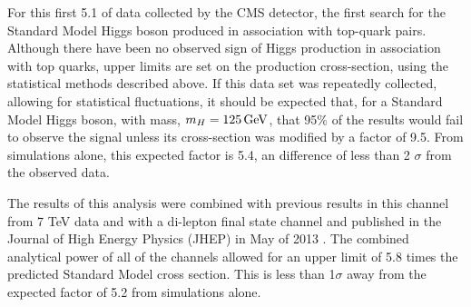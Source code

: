 \par  For this first 5.1 \fbinv of data collected by the CMS detector,
the first search for the Standard Model Higgs boson produced in
association with top-quark pairs.  Although there have been no
observed sign of Higgs production in association with top quarks,
upper limits are set on the production cross-section,  using the
statistical methods  described above.  If this data set was repeatedly
collected, allowing for statistical fluctuations, it should be
expected that, for a Standard Model Higgs boson, with mass, $m_{H} =
125 \,\text{Ge\hspace{-.08em}V}$, that 95$\%$ of the results would fail to observe the \ttH
signal unless its cross-section was modified by a factor of 9.5.  From
simulations alone, this expected factor is 5.4, an difference of less
than 2 $\sigma$ from the observed data.    

\par The results of this analysis were combined with previous results
in this channel from 7 TeV data and with a di-lepton final state
channel and published in the Journal of High Energy Physics (JHEP) in
May of 2013 \cite{Chatrchyan:2013yea}.  The combined analytical power
of all of the channels allowed for an upper limit of 5.8 times
the predicted Standard Model cross section.  This is less than
1$\sigma$ away from the expected factor of 5.2 from simulations
alone.  